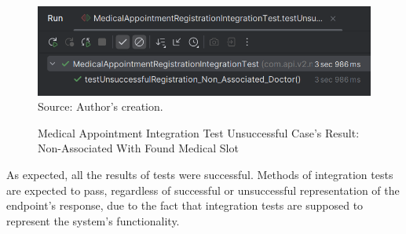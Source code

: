 \begin{figure}[H]
	\centering
	\caption{Medical Appointment Integration Test Unsuccessful Case's Result: Non-Associated With Found Medical Slot}
	\includegraphics[width=1\linewidth]{figures/medical_appointment_registration_integration_test_unsuccessful_result_nonassociated_doctor.png}
	\label{medical_appointment_registration_integration_test_unsuccessful_result_nonassociated_doctor}
	\footnotesize Source: Author's creation.
\end{figure}

As expected, all the results of tests were successful. Methods of integration tests are expected to pass, regardless of successful or unsuccessful representation of the endpoint's response, due to the fact that integration tests are supposed to represent the system's functionality.

